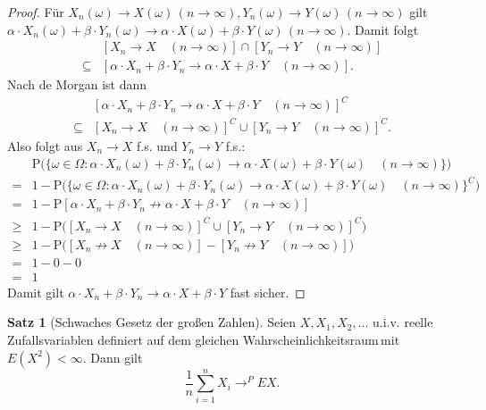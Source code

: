 \documentclass[a4paper,12pt,fleqn]{scrartcl}
\newcommand{\p}[1]{\text{P(} #1 \text{)}}
\newcommand{\WR}{Wahrscheinlichkeitsraum}
\newcommand{\ZV}{Zufallsvariable}
\theoremstyle{definition}
\newtheorem{satz}[definition]{Satz}
\theoremstyle{plain}
\theoremstyle{remark}
\begin{document}
\begin{proof}
Für $X_n(\omega) \rightarrow X(\omega) \, (n \rightarrow \infty), Y_n(\omega) \rightarrow Y(\omega) \, (n \rightarrow \infty)$ gilt $\alpha \cdot X_n(\omega) + \beta \cdot Y_n(\omega) \rightarrow \alpha \cdot X(\omega) + \beta \cdot Y(\omega) \, (n \rightarrow \infty)$. Damit folgt
\begin{align*}
&[X_n \rightarrow X \quad (n \rightarrow \infty)] \cap [Y_n \rightarrow Y \quad (n \rightarrow \infty)] \\
\subseteq&[\alpha \cdot X_n + \beta \cdot Y_n \rightarrow \alpha \cdot X + \beta \cdot Y \quad (n \rightarrow \infty)].
\end{align*}
Nach de Morgan ist dann
\begin{align*}
&[\alpha \cdot X_n + \beta \cdot Y_n \rightarrow \alpha \cdot X + \beta \cdot Y \quad (n \rightarrow \infty)]^C \\
\subseteq&[X_n \rightarrow X \quad (n \rightarrow \infty)]^C \cup [Y_n \rightarrow Y \quad (n \rightarrow \infty)]^C.
\end{align*}
Also folgt aus $X_n \rightarrow X$ f.s. und $Y_n \rightarrow Y$ f.s.:
\begin{align*}
&\p{\{\omega \in \Omega : \alpha \cdot X_n(\omega) + \beta \cdot Y_n(\omega) \rightarrow \alpha \cdot X(\omega) + \beta \cdot Y(\omega) \quad (n \rightarrow \infty)\}} \\
=&1 - \p{\{\omega \in \Omega : \alpha \cdot X_n(\omega) + \beta \cdot Y_n(\omega) \rightarrow \alpha \cdot X(\omega) + \beta \cdot Y(\omega) \quad (n \rightarrow \infty)\}^C} \\
=&1 - \text{P}[\alpha \cdot X_n + \beta \cdot Y_n \not\rightarrow \alpha \cdot X + \beta \cdot Y \quad (n \rightarrow \infty)] \\
\geq& 1 - \p{[X_n \rightarrow X \quad (n \rightarrow \infty)]^C \cup [Y_n \rightarrow Y \quad (n \rightarrow \infty)]^C} \tag{P monoton} \\
\geq& 1 - \p{[X_n \not\rightarrow X \quad (n \rightarrow \infty)] - [Y_n \not\rightarrow Y \quad (n \rightarrow \infty)]} \tag{P subadditiv}\\
=& 1 - 0 - 0 \\
=& 1
\end{align*}
Damit gilt $\alpha \cdot X_n + \beta \cdot Y_n \rightarrow \alpha \cdot X + \beta \cdot Y$ fast sicher.
\end{proof}
\begin{satz}[Schwaches Gesetz der großen Zahlen]
Seien $X, X_1, X_2, \ldots$ u.i.v. reelle \ZV n definiert auf dem gleichen \WR \,mit $E(X^2) < \infty$. Dann gilt
\[\frac{1}{n} \sum_{i=1}^n X_i \rightarrow^P EX.\]
\end{satz}
\end{document}

